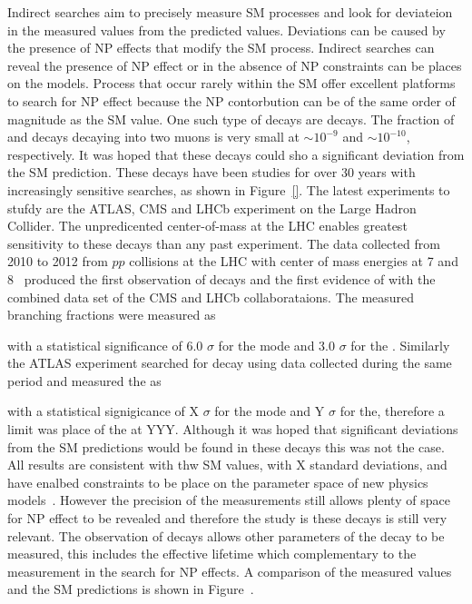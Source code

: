 Indirect searches aim to precisely measure SM processes and look for deviateion in the measured values from the predicted values. Deviations can be caused by the presence of NP effects that modify the SM process. Indirect searches can reveal the presence of NP effect or in the absence of NP constraints can be places on the models.
Process that occur rarely within the SM offer excellent platforms to search for NP effect because the NP contorbution can be of the same order of magnitude as the SM value. %
One such type of decays are \bmumu decays. The fraction of \bs and \bd decays decaying into two muons is very small at $\sim 10^{-9}$ and $\sim 10^{-10}$, respectively. It was hoped that these decays could sho a significant deviation from the SM prediction. These decays have been studies for over 30 years with increasingly sensitive searches, as shown in Figure~\ref{}. The latest experiments to stufdy are the ATLAS, CMS and LHCb experiment on the Large Hadron Collider. The unpredicented center-of-mass at the LHC enables greatest sensitivity to these decays than any past experiment.  
The data collected from 2010 to 2012 from $pp$ collisions at the LHC with center of mass energies at 7 and 8~\tev
 produced the first observation of \bsmumu decays and the first evidence of \bdmumu with the combined data set of the CMS and LHCb collaborataions. The measured branching fractions were measured as


with a statistical significance of 6.0 $\sigma$ for the \bs mode and 3.0 $\sigma$ for the \bd. Similarly the ATLAS experiment searched for \bmumu decay using data collected during the same period and measured the \BF as

with a statistical signigicance of X $\sigma$ for the \bs mode and Y $\sigma$ for the\bd, therefore a limit was place of the \bd \BF at YYY. Although it was hoped that significant deviations from the SM predictions would be found in these decays this was not the case. All results are consistent with thw SM values, with X standard deviations, and have enalbed constraints to be place on the parameter space of new physics models~\cite{}. However the precision of the measurements still allows plenty of space for NP effect to be revealed and therefore the study is these decays is still very relevant. The observation of \bsmumu decays allows other parameters of the decay to be measured, this includes the effective lifetime which complementary to the \BF measurement in the search for NP effects. A comparison of the measured \BF values and the SM predictions is shown in Figure~\cite{}.

